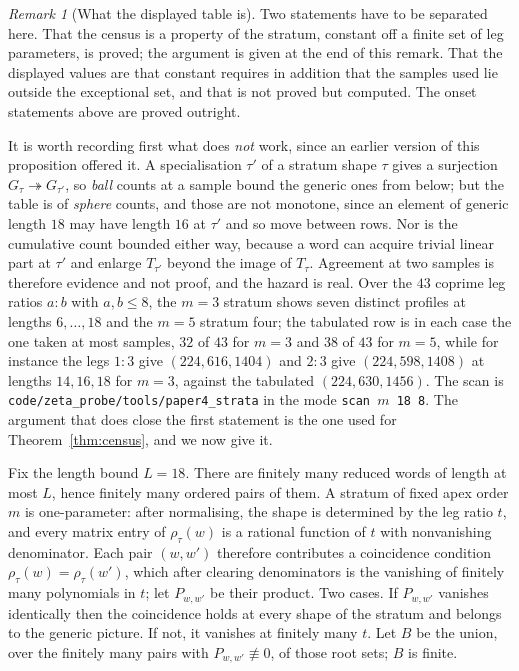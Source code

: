 \documentclass[11pt]{article}
\theoremstyle{definition}
\theoremstyle{remark}
\newtheorem{remark}[theorem]{Remark}
\begin{document}
\begin{remark}[What the displayed table is]\label{rem:cylcensus-status}
Two statements have to be separated here. That the census is a property of the
stratum, constant off a finite set of leg parameters, is proved; the argument is
given at the end of this remark. That the displayed values are that constant
requires in addition that the samples used lie outside the exceptional set, and
that is not proved but computed. The onset statements above are proved
outright.

It is worth recording first what does \emph{not} work, since an earlier version
of this proposition offered it. A specialisation $\tau'$ of a stratum shape
$\tau$ gives a surjection
$G_\tau\twoheadrightarrow G_{\tau'}$, so \emph{ball} counts at a sample bound the
generic ones from below; but the table is of \emph{sphere} counts, and those are
not monotone, since an element of generic length $18$ may have length $16$ at
$\tau'$ and so move between rows. Nor is the cumulative count bounded either
way, because a word can acquire trivial linear part at $\tau'$ and enlarge
$T_{\tau'}$ beyond the image of $T_\tau$. Agreement at two samples is therefore
evidence and not proof, and the hazard is real. Over the $43$ coprime leg ratios
$a{:}b$ with $a,b\le8$, the $m=3$ stratum shows seven distinct profiles at
lengths $6,\dots,18$ and the $m=5$ stratum four; the tabulated row is in each
case the one taken at most samples, $32$ of $43$ for $m=3$ and $38$ of $43$ for
$m=5$, while for instance the legs $1{:}3$ give $(224,616,1404)$ and $2{:}3$
give $(224,598,1408)$ at lengths $14,16,18$ for $m=3$, against the tabulated
$(224,630,1456)$. The scan is
\texttt{code/zeta\_probe/tools/paper4\_strata} in the mode
\texttt{scan $m$ 18 8}. The argument that does close the first statement is the
one used for Theorem~\ref{thm:census}, and we now give it.

Fix the length bound $L=18$. There are finitely many reduced words of length at most $L$, hence
finitely many ordered pairs of them. A stratum of fixed apex order $m$ is one-parameter: after
normalising, the shape is determined by the leg ratio $t$, and every matrix entry of
$\rho_\tau(w)$ is a rational function of $t$ with nonvanishing denominator. Each pair $(w,w')$
therefore contributes a coincidence condition $\rho_\tau(w)=\rho_\tau(w')$, which after clearing
denominators is the vanishing of finitely many polynomials in $t$; let $P_{w,w'}$ be their
product. Two cases. If $P_{w,w'}$ vanishes identically then the coincidence holds at every shape
of the stratum and belongs to the generic picture. If not, it vanishes at finitely many $t$. Let
$B$ be the union, over the finitely many pairs with $P_{w,w'}\not\equiv0$, of those root sets;
$B$ is finite.


\end{remark}
\end{document}
